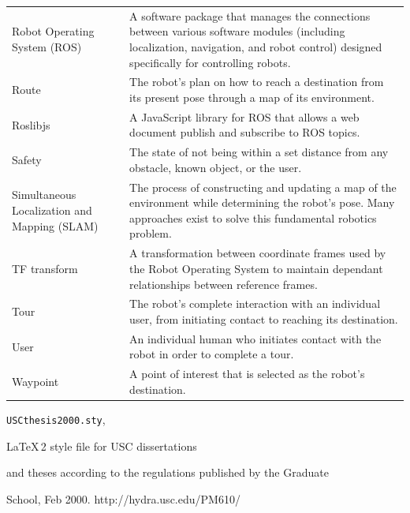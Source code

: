 \documentclass[11pt]{report}
\begin{document}
\begin{longtable}{p{3cm}p{9.9cm}}
Robot Operating System (ROS)&A software package that manages the connections between various software modules (including localization, navigation, and robot control) designed specifically for controlling robots.\\
Route&The robot’s plan on how to reach a destination from its present pose through a map of its environment.\\
Roslibjs&A JavaScript library for ROS that allows a web document publish and subscribe to ROS topics.\\
Safety&The state of not being within a set distance from any obstacle, known object, or the user.\\
Simultaneous Localization and Mapping (SLAM)&The process of constructing and updating a map of the environment while determining the robot’s pose. Many approaches exist to solve this fundamental robotics problem.\\
TF transform&A transformation between coordinate frames used by the Robot Operating System to maintain dependant relationships between reference frames.\\
Tour&The robot’s complete interaction with an individual user, from initiating contact to reaching its destination.\\
User&An individual human who initiates contact with the robot in order to complete a tour.\\
Waypoint&A point of interest that is selected as the robot’s destination.
\end{longtable}



\begin{thebibliography}{99}

  \verb=USCthesis2000.sty=,

 \LaTeX\,2\raisebox{-0.2ex}{$\varepsilon$} style file for USC dissertations

 and theses according to the regulations published by the Graduate

 School, Feb 2000. http://hydra.usc.edu/PM610/

\end{thebibliography}
\end{document}
